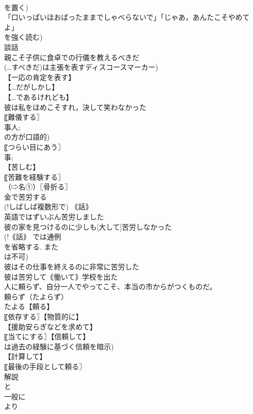 \documentclass[8pt]{extreport}
\begin{document}
\begin{CJK}{UTF8}{min}
\\	を置く)
\\	「口いっぱいほおばったままでしゃべらないで」「じゃあ，あんたこそやめてよ」
\\	を強く読む)
\\	談話
\\	親こそ子供に食卓での行儀を教えるべきだ
\\	(…すべきだ)は主張を表すディスコースマーカー)
\\	【一応の肯定を表す】
\\	【…だがしかし】
\\	【…であるけれども】
\\	彼は私をほめこそすれ，決して笑わなかった
\\	〖難儀する〗
\\	事人; 
\\	の方が口語的) 
\\	〖つらい目にあう〗
\\	事; 
\\	【苦しむ】
\\	〖苦難を経験する〗
\\	（⇨名①）〖骨折る〗
\\	金で苦労する
\\	(!しばしば複数形で) ｟話｠
\\	英語ではずいぶん苦労しました
\\	彼の家を見つけるのに少しも[大して]苦労しなかった
\\	(!｟話｠ では通例 
\\	を省略する. また 
\\	は不可) 
\\	彼はその仕事を終えるのに非常に苦労した
\\	彼は苦労して｟働いて｠学校を出た
\\	人に頼らず、自分一人でやってこそ、本当の市からがつくものだ。		
\\	頼らず（たよらず）
\\	たよる【頼る】
\\	〖依存する〗【物質的に】
\\	【援助安らぎなどを求めて】
\\	〖当てにする〗【信頼して】
\\	は過去の経験に基づく信頼を暗示) 
\\	【計算して】
\\	〖最後の手段として頼る〗
\\	解説
\\	と 
\\	一般に 
\\	より 

\end{CJK}
\end{document}
